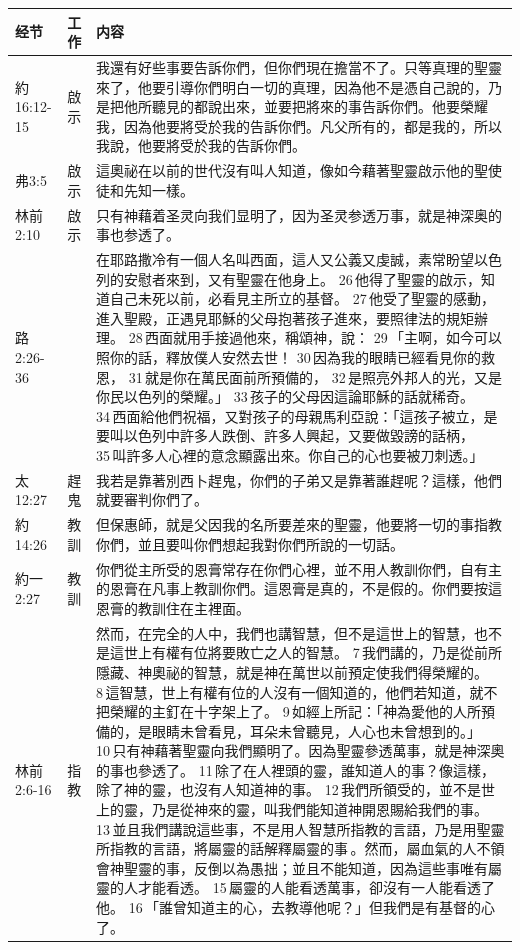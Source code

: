 \begin{table}[H]
\centering
\begin{tabular}{p{6em}|p{4em}|p{37em}}  \toprule
经节&工作&内容 \\  \midrule

約16:12-15&啟示&我還有好些事要告訴你們，但你們現在擔當不了。只等真理的聖靈來了，他要引導你們明白一切的真理，因為他不是憑自己說的，乃是把他所聽見的都說出來，並要把將來的事告訴你們。他要榮耀我，因為他要將受於我的告訴你們。凡父所有的，都是我的，所以我說，他要將受於我的告訴你們。\\  \midrule
弗3:5&啟示&這奧祕在以前的世代沒有叫人知道，像如今藉著聖靈啟示他的聖使
徒和先知一樣。\\  \midrule

林前2:10&啟示&只有神藉着圣灵向我们显明了，因为圣灵参透万事，就是神深奥的事也参透了。\\  \midrule

路2:26-36&&在耶路撒冷有一個人名叫西面，這人又公義又虔誠，素常盼望以色列的安慰者來到，又有聖靈在他身上。 26 他得了聖靈的啟示，知道自己未死以前，必看見主所立的基督。 27 他受了聖靈的感動，進入聖殿，正遇見耶穌的父母抱著孩子進來，要照律法的規矩辦理。 28 西面就用手接過他來，稱頌神，說： 29 「主啊，如今可以照你的話，釋放僕人安然去世！ 30 因為我的眼睛已經看見你的救恩， 31 就是你在萬民面前所預備的， 32 是照亮外邦人的光，又是你民以色列的榮耀。」 33 孩子的父母因這論耶穌的話就稀奇。 34 西面給他們祝福，又對孩子的母親馬利亞說：「這孩子被立，是要叫以色列中許多人跌倒、許多人興起，又要做毀謗的話柄， 35 叫許多人心裡的意念顯露出來。你自己的心也要被刀刺透。」\\  \midrule

太12:27&趕鬼&我若是靠著別西卜趕鬼，你們的子弟又是靠著誰趕呢？這樣，他們就要審判你們了。\\  \midrule

約14:26&教訓&但保惠師，就是父因我的名所要差來的聖靈，他要將一切的事指教你們，並且要叫你們想起我對你們所說的一切話。\\  \midrule
約一2:27&教訓&你們從主所受的恩膏常存在你們心裡，並不用人教訓你們，自有主的恩膏在凡事上教訓你們。這恩膏是真的，不是假的。你們要按這恩膏的教訓住在主裡面。\\  \midrule
林前2:6-16&指教&然而，在完全的人中，我們也講智慧，但不是這世上的智慧，也不是這世上有權有位將要敗亡之人的智慧。 7 我們講的，乃是從前所隱藏、神奧祕的智慧，就是神在萬世以前預定使我們得榮耀的。 8 這智慧，世上有權有位的人沒有一個知道的，他們若知道，就不把榮耀的主釘在十字架上了。 9 如經上所記：「神為愛他的人所預備的，是眼睛未曾看見，耳朵未曾聽見，人心也未曾想到的。」 10 只有神藉著聖靈向我們顯明了。因為聖靈參透萬事，就是神深奧的事也參透了。 11 除了在人裡頭的靈，誰知道人的事？像這樣，除了神的靈，也沒有人知道神的事。 12 我們所領受的，並不是世上的靈，乃是從神來的靈，叫我們能知道神開恩賜給我們的事。 13 並且我們講說這些事，不是用人智慧所指教的言語，乃是用聖靈所指教的言語，將屬靈的話解釋屬靈的事 。然而，屬血氣的人不領會神聖靈的事，反倒以為愚拙；並且不能知道，因為這些事唯有屬靈的人才能看透。 15 屬靈的人能看透萬事，卻沒有一人能看透了他。 16 「誰曾知道主的心，去教導他呢？」但我們是有基督的心了。\\  \midrule


\end{tabular}
\end{table}
